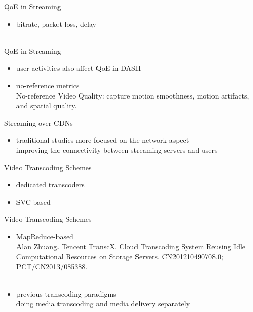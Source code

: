 \documentclass{beamer}
\begin{document}
\begin{frame}{QoE in Streaming}
	\begin{itemize}
		\item<1> bitrate, packet loss, delay \\
		 \\
	\end{itemize}
\end{frame}
\begin{frame}{QoE in Streaming}
	\begin{itemize}
		\item<1> user activities also affect QoE in DASH\\
		\item<1> no-reference metrics\\
		No-reference Video Quality: capture motion smoothness, motion artifacts, and spatial quality.
	\end{itemize}
\end{frame}

\begin{frame}{Streaming over CDNs}
	\begin{itemize}
		\item<1> traditional studies more focused on the network aspect\\
		improving the connectivity between streaming servers and users\\
	\end{itemize}
\end{frame}

\begin{frame}{Video Transcoding Schemes}
	\begin{itemize}
		\item<1> dedicated transcoders\\
		\item<1> SVC based\\
	\end{itemize}
\end{frame}
\begin{frame}{Video Transcoding Schemes}
	\begin{itemize}
		\item<1> MapReduce-based\\
		Alan Zhuang. Tencent TranscX. Cloud Transcoding System Reusing Idle Computational Resources on Storage Servers. CN201210490708.0; PCT/CN2013/085388.\\
		\\
		\item<1> previous transcoding paradigms\\
		doing media transcoding and media delivery separately
	\end{itemize}
\end{frame}
\end{document}
